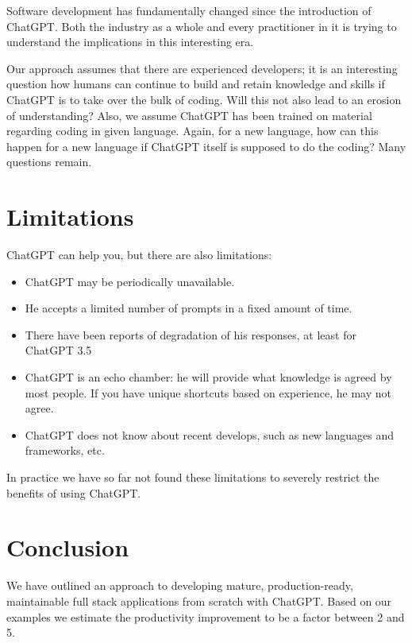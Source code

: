 \documentclass[runningheads]{llncs}
\begin{document}
Software development has fundamentally changed since the introduction of ChatGPT. Both the industry as a whole and every practitioner in it is trying to understand the implications in this interesting era.

Our approach assumes that there are experienced developers; it is an interesting question how humans can continue to build and retain knowledge and skills if ChatGPT is to take over the bulk of coding. Will this not also lead to an erosion of understanding? Also, we assume ChatGPT has been trained on material regarding coding in given language. Again, for a new language, how can this happen for a new language if ChatGPT itself is supposed to do the coding? Many questions remain.

\section{Limitations}
ChatGPT can help you, but there are also limitations:
\begin{itemize}
    \item ChatGPT may be periodically unavailable.
    \item He accepts a limited number of prompts in a fixed amount of time.
    \item There have been reports of degradation of his responses, at least for ChatGPT 3.5
    \item ChatGPT is an echo chamber: he will provide what knowledge is agreed by most people. If you have unique shortcuts based on experience, he may not agree.
    \item ChatGPT does not know about recent develops, such as new languages and frameworks, etc.
\end{itemize}
In practice we have so far not found these limitations to severely restrict the benefits of using ChatGPT.

\section{Conclusion}
We have outlined an approach to developing mature, production-ready, maintainable full stack applications from scratch with ChatGPT. Based on our examples we estimate the productivity improvement to be a factor between 2 and 5.
\end{document}

